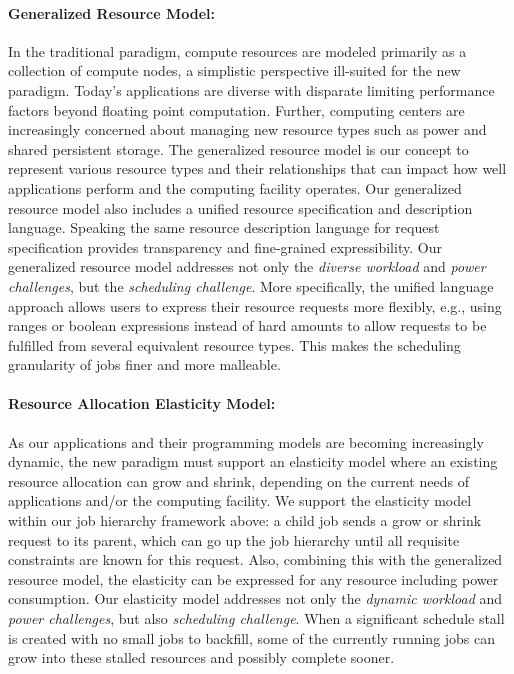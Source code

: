 \documentclass[10pt]{article}
\begin{document}
\paragraph{Generalized Resource Model:}
In the traditional paradigm, compute resources are modeled primarily as a collection of compute nodes,
a simplistic perspective ill-suited for the new paradigm. 
Today's applications are diverse with disparate limiting performance 
factors beyond floating point computation. Further, computing centers
are increasingly concerned about managing new resource types such as power
and shared persistent storage. The generalized resource model is our concept
to represent various resource types and their relationships 
that can impact how well applications perform and the computing
facility operates. Our generalized resource model also includes a
unified resource specification and description language. Speaking the
same resource description language for request specification 
provides transparency and fine-grained expressibility.
Our generalized resource model addresses not only the {\sl diverse workload}
and {\sl power challenges}, but the {\sl scheduling challenge}. More specifically, 
the unified language approach allows users to express their resource requests
more flexibly, e.g., using ranges or boolean expressions instead of hard amounts to allow requests to be fulfilled from several equivalent resource types.
This makes the scheduling granularity of jobs finer and more malleable.

\paragraph{Resource Allocation Elasticity Model:}
As our applications and their programming models are becoming increasingly
dynamic, the new paradigm must support an elasticity model where an existing
resource allocation can grow and shrink, depending on the current needs
of applications and/or the computing facility. We support the 
elasticity model within our job hierarchy framework above: a child job sends
a grow or shrink request to its parent, which can go up the job hierarchy
until all requisite constraints are known for this request. Also, combining
this with the generalized resource model, the elasticity can be expressed for
any resource including power consumption. Our elasticity model addresses
not only the {\sl dynamic workload} and {\sl power challenges}, but also
{\sl scheduling challenge}. When a significant schedule stall is created 
with no small jobs to backfill, some of the currently running
jobs can grow into these stalled resources and possibly complete sooner.  
\end{document}
